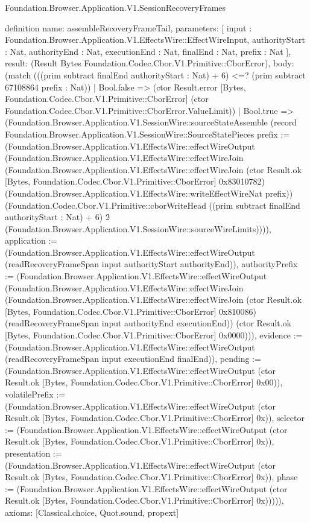 \begin{lexlean}{Foundation.Browser.Application.V1.SessionRecoveryFrames}
\begin{semanticmodule}
definition{
  name: assembleRecoveryFrameTail,
  parameters: [
    input : Foundation.Browser.Application.V1.EffectsWire::EffectWireInput,
    authorityStart : Nat,
    authorityEnd : Nat,
    executionEnd : Nat,
    finalEnd : Nat,
    prefix : Nat
  ],
  result: (Result Bytes Foundation.Codec.Cbor.V1.Primitive::CborError),
  body: (match (((prim subtract finalEnd authorityStart : Nat) + 6) <=? (prim subtract 67108864 prefix : Nat))
    | Bool.false => (ctor Result.error [Bytes, Foundation.Codec.Cbor.V1.Primitive::CborError] (ctor Foundation.Codec.Cbor.V1.Primitive::CborError.ValueLimit))
    | Bool.true => (Foundation.Browser.Application.V1.SessionWire::sourceStateAssemble (record Foundation.Browser.Application.V1.SessionWire::SourceStatePieces {prefix := (Foundation.Browser.Application.V1.EffectsWire::effectWireOutput (Foundation.Browser.Application.V1.EffectsWire::effectWireJoin (Foundation.Browser.Application.V1.EffectsWire::effectWireJoin (ctor Result.ok [Bytes, Foundation.Codec.Cbor.V1.Primitive::CborError] 0x83010782) (Foundation.Browser.Application.V1.EffectsWire::writeEffectWireNat prefix)) (Foundation.Codec.Cbor.V1.Primitive::cborWriteHead ((prim subtract finalEnd authorityStart : Nat) + 6) 2 (Foundation.Browser.Application.V1.SessionWire::sourceWireLimits)))), application := (Foundation.Browser.Application.V1.EffectsWire::effectWireOutput (readRecoveryFrameSpan input authorityStart authorityEnd)), authorityPrefix := (Foundation.Browser.Application.V1.EffectsWire::effectWireOutput (Foundation.Browser.Application.V1.EffectsWire::effectWireJoin (Foundation.Browser.Application.V1.EffectsWire::effectWireJoin (ctor Result.ok [Bytes, Foundation.Codec.Cbor.V1.Primitive::CborError] 0x810086) (readRecoveryFrameSpan input authorityEnd executionEnd)) (ctor Result.ok [Bytes, Foundation.Codec.Cbor.V1.Primitive::CborError] 0x0000))), evidence := (Foundation.Browser.Application.V1.EffectsWire::effectWireOutput (readRecoveryFrameSpan input executionEnd finalEnd)), pending := (Foundation.Browser.Application.V1.EffectsWire::effectWireOutput (ctor Result.ok [Bytes, Foundation.Codec.Cbor.V1.Primitive::CborError] 0x00)), volatilePrefix := (Foundation.Browser.Application.V1.EffectsWire::effectWireOutput (ctor Result.ok [Bytes, Foundation.Codec.Cbor.V1.Primitive::CborError] 0x)), selector := (Foundation.Browser.Application.V1.EffectsWire::effectWireOutput (ctor Result.ok [Bytes, Foundation.Codec.Cbor.V1.Primitive::CborError] 0x)), presentation := (Foundation.Browser.Application.V1.EffectsWire::effectWireOutput (ctor Result.ok [Bytes, Foundation.Codec.Cbor.V1.Primitive::CborError] 0x)), phase := (Foundation.Browser.Application.V1.EffectsWire::effectWireOutput (ctor Result.ok [Bytes, Foundation.Codec.Cbor.V1.Primitive::CborError] 0x))}))),
  axioms: [Classical.choice, Quot.sound, propext]
}


\end{semanticmodule}
\end{lexlean}
